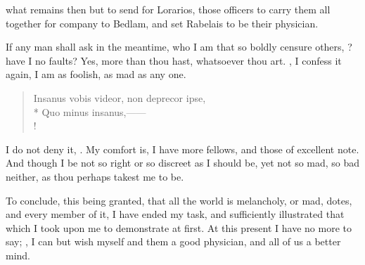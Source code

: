 
what remains then but to send for Lorarios, those officers
to carry them all together for company to Bedlam, and set Rabelais to be their
physician.

If any man shall ask in the meantime, who I am that so boldly censure others,
? have I no faults? Yes, more
than thou hast, whatsoever thou art. , I confess it
again, I am as foolish, as mad as any one.

\begin{latin}
\begin{verse}%
Insanus vobis videor, non deprecor ipse,\\*
Quo minus insanus,------\\!
\end{verse}%
\end{latin}

I do not deny it, . My comfort is, I have more
fellows, and those of excellent note. And though I be not so right or so
discreet as I should be, yet not so mad, so bad neither, as thou perhaps takest
me to be.

To conclude, this being granted, that all the world is melancholy, or mad,
dotes, and every member of it, I have ended my task, and sufficiently
illustrated that which I took upon me to demonstrate at first. At this present
I have no more to say; , I can but wish myself
and them a good physician, and all of us a better mind.

